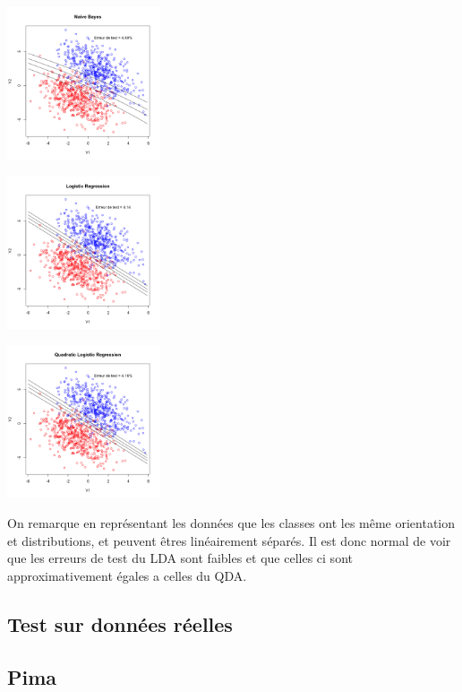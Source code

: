 \documentclass[10pt]{article}
\begin{document}
\begin{center}
	\includegraphics[width=45mm]{Figures/synth3_nb.png}
\end{center}
\begin{minipage}{.5\textwidth}
	\includegraphics[width=45mm]{Figures/synth3_logreg.png}
\end{minipage}%
\hspace{0.02\linewidth}
\begin{minipage}{.5\textwidth}
	\includegraphics[width=45mm]{Figures/synth3_logregquad.png}
\end{minipage}

On remarque en représentant les données que les classes ont les même orientation et distributions, et peuvent êtres linéairement séparés.  Il est donc normal de voir que les erreurs de test du LDA  sont faibles et que celles ci sont approximativement égales a celles du QDA. 




\subsection{Test sur données réelles}
\subsection{Pima}
\end{document}
